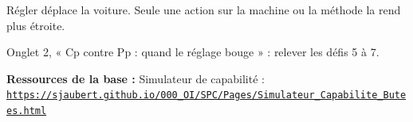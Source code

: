 \documentclass[10pt,a4paper]{article}
\begin{document}
\begin{tcolorbox}[retenir]Régler déplace la voiture. Seule une action sur la machine ou la méthode la rend plus étroite.\end{tcolorbox}
\begin{tcolorbox}[plus]Onglet 2, « Cp contre Pp : quand le réglage bouge » : relever les défis 5 à 7.\end{tcolorbox}
\vfill{\footnotesize\color{uimm}\textbf{Ressources de la base :} Simulateur de capabilité : \href{https://sjaubert.github.io/000_OI/SPC/Pages/Simulateur_Capabilite_Butees.html}{\nolinkurl{https://sjaubert.github.io/000_OI/SPC/Pages/Simulateur_Capabilite_Butees.html}}}
\end{document}
